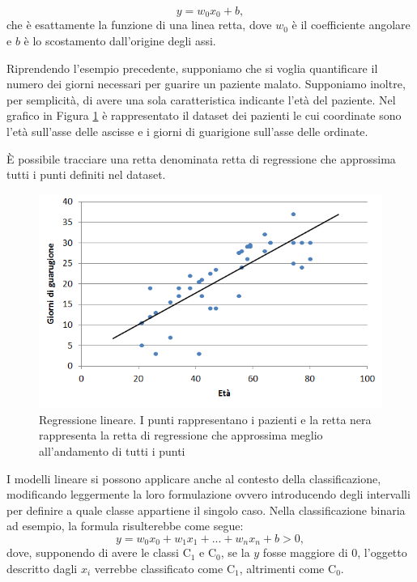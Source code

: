 \documentclass[12pt,italian]{report}
\begin{document}
\[ y = w_{0}x_{0} + b,\]
che è esattamente la funzione di una linea retta, dove $ w_{0}$ è il coefficiente angolare e $ b $ è lo scostamento dall'origine degli assi.

Riprendendo l'esempio precedente, supponiamo che si voglia quantificare il numero dei giorni necessari per guarire un paziente malato.
Supponiamo inoltre, per semplicità, di avere una sola caratteristica indicante l'età del paziente.
Nel grafico in Figura \ref{fig:linear_regression} è rappresentato il dataset dei pazienti le cui coordinate sono l'età sull'asse delle ascisse e i giorni di guarigione sull'asse delle ordinate.

È possibile tracciare una retta denominata retta di regressione che approssima tutti i punti definiti nel dataset. 

\begin{figure}[h!]
	\center
	\includegraphics[scale=0.6]{../img/linear_regression}
	\caption{Regressione lineare. I punti rappresentano i pazienti e la retta nera rappresenta la retta di regressione che approssima meglio all'andamento di tutti i punti}
	\label{fig:linear_regression}
\end{figure}

I modelli lineare si possono applicare anche al contesto della classificazione, modificando leggermente la loro formulazione ovvero introducendo degli intervalli per definire a quale classe appartiene il singolo caso. Nella classificazione binaria ad esempio, la formula risulterebbe come segue:
\[ y = w_{0}x_{0} + w_{1}x_{1} + ... + w_{n}x_{n} + b > 0, \]
dove, supponendo di avere le classi $ \mathrm{C_1} $ e $ \mathrm{C_0} $, se la $ y $ fosse maggiore di $ 0 $, l'oggetto descritto dagli $x_{i}$ verrebbe classificato come $ \mathrm{C_1} $, altrimenti come $ \mathrm{C_0} $.
%
\end{document}
